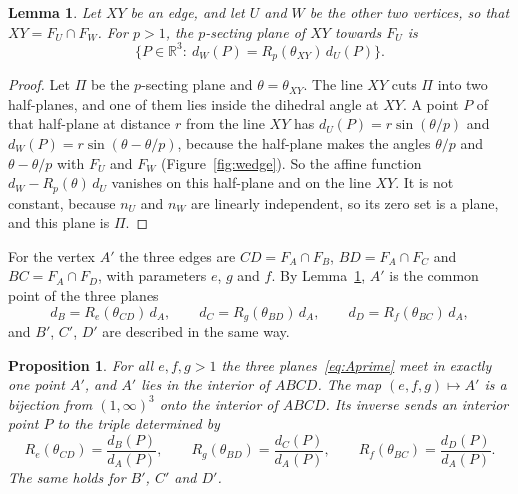 \documentclass[11pt]{amsart}
\newtheorem{proposition}[theorem]{Proposition}
\newtheorem{lemma}[theorem]{Lemma}
\theoremstyle{definition}
\theoremstyle{remark}
\numberwithin{equation}{section}
\newcommand{\R}{\mathbb{R}}
\begin{document}
\begin{lemma}\label{lem:plane}
Let $XY$ be an edge, and let $U$ and $W$ be the other two vertices, so that $XY=F_U\cap F_W$. For $p>1$, the $p$-secting plane of $XY$ towards $F_U$ is
\[
\{P\in\R^3:\ d_W(P)=R_p(\theta_{XY})\,d_U(P)\}.
\]
\end{lemma}

\begin{proof}
Let $\Pi$ be the $p$-secting plane and $\theta=\theta_{XY}$. The line $XY$ cuts $\Pi$ into two half-planes, and one of them lies inside the dihedral angle at $XY$. A point $P$ of that half-plane at distance $r$ from the line $XY$ has $d_U(P)=r\sin(\theta/p)$ and $d_W(P)=r\sin(\theta-\theta/p)$, because the half-plane makes the angles $\theta/p$ and $\theta-\theta/p$ with $F_U$ and $F_W$ (Figure~\ref{fig:wedge}). So the affine function $d_W-R_p(\theta)\,d_U$ vanishes on this half-plane and on the line $XY$. It is not constant, because $n_U$ and $n_W$ are linearly independent, so its zero set is a plane, and this plane is $\Pi$.
\end{proof}

For the vertex $A'$ the three edges are $CD=F_A\cap F_B$, $BD=F_A\cap F_C$ and $BC=F_A\cap F_D$, with parameters $e$, $g$ and $f$. By Lemma~\ref{lem:plane}, $A'$ is the common point of the three planes
\begin{equation}\label{eq:Aprime}
d_B=R_e(\theta_{CD})\,d_A,\qquad d_C=R_g(\theta_{BD})\,d_A,\qquad d_D=R_f(\theta_{BC})\,d_A ,
\end{equation}
and $B'$, $C'$, $D'$ are described in the same way.

\begin{proposition}\label{prop:param}
For all $e,f,g>1$ the three planes~\eqref{eq:Aprime} meet in exactly one point $A'$, and $A'$ lies in the interior of $ABCD$. The map $(e,f,g)\mapsto A'$ is a bijection from $(1,\infty)^3$ onto the interior of $ABCD$. Its inverse sends an interior point $P$ to the triple determined by
\begin{equation}\label{eq:inverse}
R_e(\theta_{CD})=\frac{d_B(P)}{d_A(P)},\qquad R_g(\theta_{BD})=\frac{d_C(P)}{d_A(P)},\qquad R_f(\theta_{BC})=\frac{d_D(P)}{d_A(P)} .
\end{equation}
The same holds for $B'$, $C'$ and $D'$.
\end{proposition}
\end{document}
